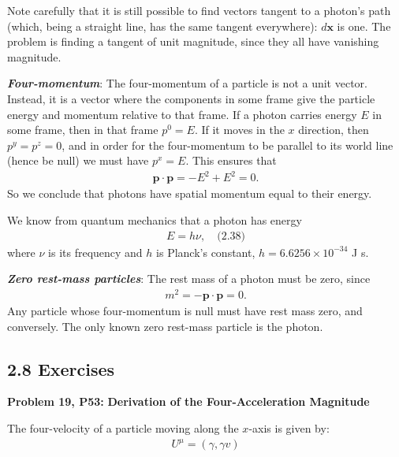 \documentclass[12pt]{book}
\begin{document}
        Note carefully that it is still possible to find vectors tangent to a photon’s path (which, being a straight line, has the same tangent everywhere): \( d\mathbf{x} \) is one. The problem is finding a tangent of unit magnitude, since they all have vanishing magnitude.

        \textit{\textbf{Four-momentum}}:
        The four-momentum of a particle is not a unit vector. Instead, it is a vector where the components in some frame give the particle energy and momentum relative to that frame. If a photon carries energy \( E \) in some frame, then in that frame \( p^0 = E \). If it moves in the \( x \) direction, then \( p^y = p^z = 0 \), and in order for the four-momentum to be parallel to its world line (hence be null) we must have \( p^x = E \). This ensures that
        \begin{align}
        \mathbf{p} \cdot \mathbf{p} = -E^2 + E^2 = 0.
        \end{align}
        So we conclude that photons have spatial momentum equal to their energy.
        
        We know from quantum mechanics that a photon has energy
        \begin{align}
        E = h\nu, \quad \text{(2.38)}
        \end{align}
        where \( \nu \) is its frequency and \( h \) is Planck’s constant, \( h = 6.6256 \times 10^{-34} \) J s.

        \textit{\textbf{Zero rest-mass particles}}:
        The rest mass of a photon must be zero, since
        \begin{align}
        m^2 = -\mathbf{p} \cdot \mathbf{p} = 0.
        \end{align}
        Any particle whose four-momentum is null must have rest mass zero, and conversely. The only known zero rest-mass particle is the photon.

        \subsection{2.8 Exercises}
        \textbf{Problem 19, P53:}
            \textbf{Derivation of the Four-Acceleration Magnitude}
            
            The four-velocity of a particle moving along the \( x \)-axis is given by:
            \begin{align}
            U^\mu = \left(\gamma, \gamma v\right)
            \end{align}
                    
\end{document}
